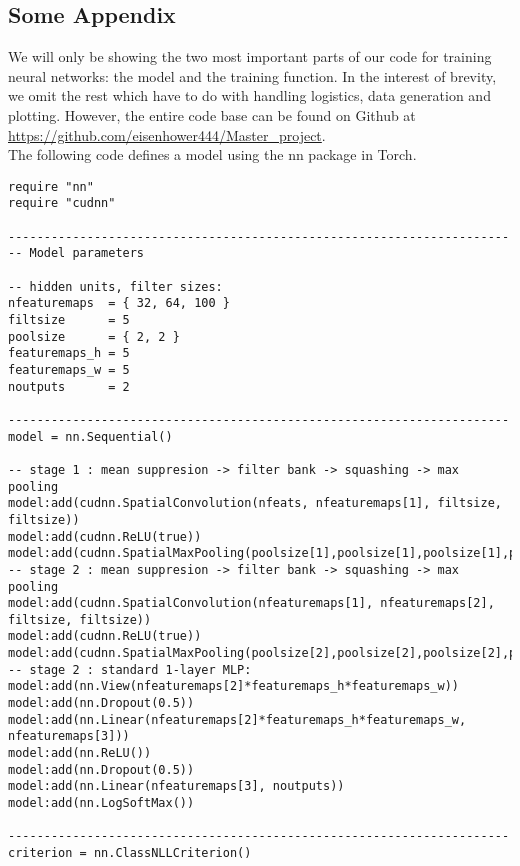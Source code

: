 
\begin{appendices}
\chapter{Some Appendix}

\lstset{style=myLuastyle}

We will only be showing the two most important parts of our code for training neural networks: the model and the training function. In the interest of brevity, we omit the rest which have to do with handling logistics, data generation and plotting. However, the entire code base can be found on Github at \url{https://github.com/eisenhower444/Master_project}.\\

\noindent The following code defines a model using the nn package in Torch.\\

\begin{lstlisting}
require "nn"
require "cudnn"

----------------------------------------------------------------------
-- Model parameters

-- hidden units, filter sizes:
nfeaturemaps  = { 32, 64, 100 }
filtsize 	  = 5
poolsize 	  = { 2, 2 }
featuremaps_h = 5
featuremaps_w = 5
noutputs 	  = 2

----------------------------------------------------------------------
model = nn.Sequential()

-- stage 1 : mean suppresion -> filter bank -> squashing -> max pooling
model:add(cudnn.SpatialConvolution(nfeats, nfeaturemaps[1], filtsize, filtsize))
model:add(cudnn.ReLU(true))
model:add(cudnn.SpatialMaxPooling(poolsize[1],poolsize[1],poolsize[1],poolsize[1]))
-- stage 2 : mean suppresion -> filter bank -> squashing -> max pooling
model:add(cudnn.SpatialConvolution(nfeaturemaps[1], nfeaturemaps[2], filtsize, filtsize))
model:add(cudnn.ReLU(true))
model:add(cudnn.SpatialMaxPooling(poolsize[2],poolsize[2],poolsize[2],poolsize[2]))
-- stage 2 : standard 1-layer MLP:
model:add(nn.View(nfeaturemaps[2]*featuremaps_h*featuremaps_w))
model:add(nn.Dropout(0.5))
model:add(nn.Linear(nfeaturemaps[2]*featuremaps_h*featuremaps_w, nfeaturemaps[3]))
model:add(nn.ReLU())
model:add(nn.Dropout(0.5))
model:add(nn.Linear(nfeaturemaps[3], noutputs))
model:add(nn.LogSoftMax())

----------------------------------------------------------------------
criterion = nn.ClassNLLCriterion()
\end{lstlisting}


\end{appendices}
